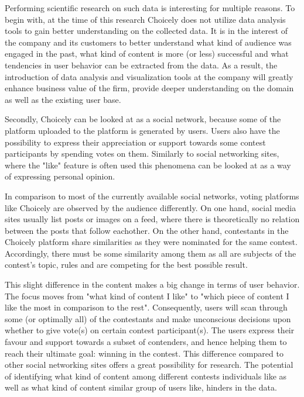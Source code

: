     Performing scientific research on such data is interesting for multiple reasons. To begin with, at the time of this research Choicely does not utilize data analysis tools to gain better understanding on the collected data. It is in the interest of the company and its customers to better understand what kind of audience was engaged in the past, what kind of content is more (or less) successful and what tendencies in user behavior can be extracted from the data. As a result, the introduction of data analysis and visualization tools at the company will greatly enhance business value of the firm, provide deeper understanding on the domain as well as the existing user base.   
    
    Secondly, Choicely can be looked at as a social network, because some of the platform uploaded to the platform is generated by users. Users also have the possibility to express their appreciation or support towards some contest participants by spending votes on them. Similarly to social networking sites, where the "like" feature is often used \cite{jang2015noreciprocity, bakhshi2014faces} this phenomena can be looked at as a way of expressing personal opinion. 
    
    In comparison to most of the currently available social networks, voting platforms like Choicely are observed by the audience differently. On one hand, social media sites usually list posts or images on a feed, where there is theoretically no relation between the posts that follow eachother. On the other hand, contestants in the Choicely platform share similarities as they were nominated for the same contest. Accordingly, there must be some similarity among them as all are subjects of the contest's topic, rules and are competing for the best possible result. 

    This slight difference in the content makes a big change in terms of user behavior. The focus moves from "what kind of content I like" to "which piece of content I like the most in comparison to the rest". Consequently, users will scan through some (or optimally all) of the contestants and make unconscious decisions upon whether to give vote(s) on certain contest participant(s). The users express their favour and support towards a subset of contenders, and hence helping them to reach their ultimate goal: winning in the contest. 
    This difference compared to other social networking sites offers a great possibility for research. The potential of identifying what kind of content among different contests individuals like as well as what kind of content similar group of users like, hinders in the data.    

